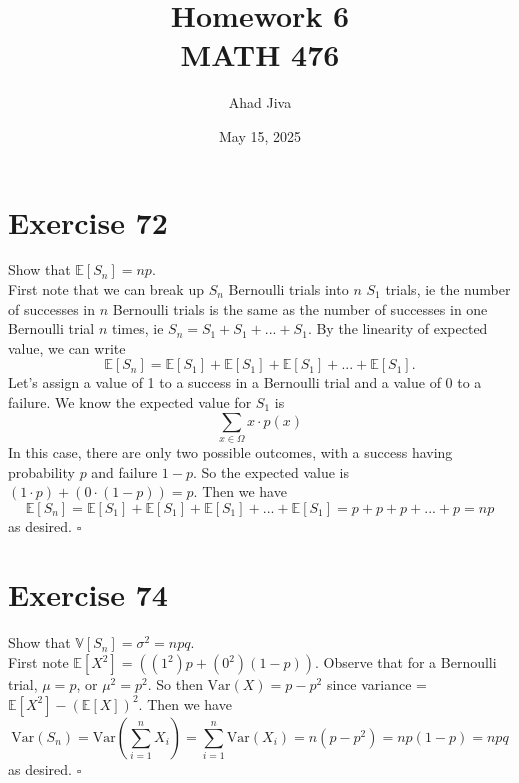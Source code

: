 \documentclass{article}
\title{Homework 6 \\ \large MATH 476}
\author{Ahad Jiva}
\date{May 15, 2025}
\begin{document}
\maketitle

\section*{Exercise 72}
\begin{flushleft}
    Show that $\mathbb{E}[S_n] = np$. \\
    First note that we can break up $S_n$ Bernoulli trials into $n$ $S_1$ trials, ie the number of successes in $n$ Bernoulli trials is the same as the number of successes in one Bernoulli trial $n$ times, ie
    $S_n = S_1 + S_1 + ... + S_1$. By the linearity of expected value, we can write
    \begin{equation*}
        \mathbb{E}[S_n] = \mathbb{E}[S_1] + \mathbb{E}[S_1] + \mathbb{E}[S_1] + ... + \mathbb{E}[S_1].
    \end{equation*}
    Let's assign a value of 1 to a success in a Bernoulli trial and a value of 0 to a failure. We know the expected value for $S_1$ is \\
    \begin{equation*}
        \sum_{x \in \Omega}{x \cdot p(x)}
    \end{equation*}
    In this case, there are only two possible outcomes, with a success having probability $p$ and failure $1-p$. So the expected value is $(1 \cdot p) + (0 \cdot (1-p)) = p$. 
    Then we have
    \begin{equation*}
        \mathbb{E}[S_n] = \mathbb{E}[S_1] + \mathbb{E}[S_1] + \mathbb{E}[S_1] + ... + \mathbb{E}[S_1] = p + p + p + ... + p = np
    \end{equation*}
    as desired. $\square$
\end{flushleft}

\section*{Exercise 74}
\begin{flushleft}
    Show that $\mathbb{V}[S_n] = \sigma^2 = npq$. \\
    First note $\mathbb{E}[X^2] = ((1^2)p + (0^2)(1-p))$. Observe that for a Bernoulli trial, $\mu = p$, or $\mu ^2 = p^2$. So then $\text{Var}(X) = p - p^2$ since variance = $\mathbb{E}[X^2] - (\mathbb{E}[X])^2$. Then we have
    \begin{equation*}
        \text{Var}(S_n) = \text{Var}(\sum_{i=1}^{n}{X_i}) = \sum_{i=1}^{n}{\text{Var}(X_i)} = n(p-p^2) = np(1-p) = npq
    \end{equation*}
    as desired. $\square$
\end{flushleft}
\end{document}
